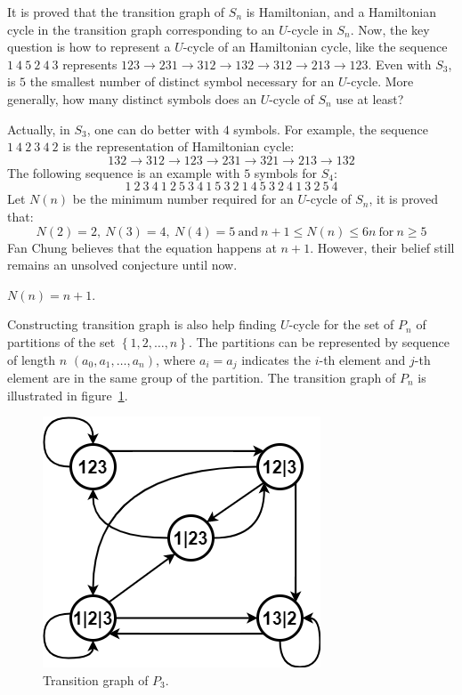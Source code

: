 It is proved that the transition graph of $S_{n}$ is Hamiltonian, and a Hamiltonian cycle in the transition graph corresponding to an $U$-cycle in $S_{n}$. Now, the key question is how to represent a $U$-cycle of an Hamiltonian cycle, like the sequence $1\ 4\ 5\ 2\ 4\ 3$ represents $123\rightarrow 231\rightarrow 312\rightarrow132\rightarrow312\rightarrow 213\rightarrow123 $. Even with $S_{3}$, is $5$ the smallest number of distinct symbol necessary for an $U$-cycle. More generally, how many distinct symbols does an $U$-cycle of $S_{n}$ use at least? 

Actually, in $S_{3}$, one can do better with $4$ symbols. For example, the sequence $1\ 4\ 2\ 3\ 4\ 2$ is the representation of Hamiltonian cycle:
\[132\rightarrow312\rightarrow123\rightarrow231\rightarrow321\rightarrow213\rightarrow132\]
The following sequence is an example with $5$ symbols for $S_{4}$:
\[1\ 2\ 3\ 4\ 1\ 2\ 5\ 3\ 4\ 1\ 5\ 3\ 2\ 1\ 4\ 5\ 3\ 2\ 4\ 1\ 3\ 2\ 5\ 4 \]
Let $N(n)$ be the minimum number required for an $U$-cycle of $S_{n}$, it is proved that:
\[N(2)=2,\ N(3) = 4,\ N(4)=5\ \mathrm{and}\ n+1\leq N(n)\leq 6n\ \mathrm{for}\ n\geq5\]
Fan Chung believes that the equation happens at $n+1$. However, their belief still remains an unsolved conjecture until now.
\begin{conjecture}
    $N(n)=n+1$.
\end{conjecture}

Constructing transition graph is also help finding $U$-cycle for the set of $P_{n}$ of partitions of the set $\left\{1,2,\ldots,n\right\}$. The partitions can be represented by sequence of length $n$ $(a_{0},a_{1},\ldots,a_{n})$, where $a_{i}=a_{j}$ indicates the $i$-th element and $j$-th element are in the same group of the partition. The transition graph of $P_{n}$ is illustrated in figure~\ref{fig:P3_graph}.

\begin{figure}[htbp]
    \centering
    \includegraphics[scale=0.5]{fig/partitions.png}
    \caption{Transition graph of $P_{3}$.}
    \label{fig:P3_graph}
\end{figure}

